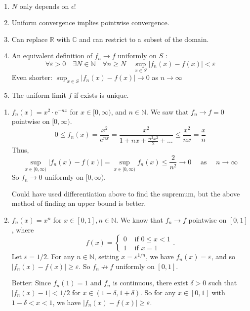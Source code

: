 \documentclass[a4paper]{article}
\begin{document}
\begin{remark}\
    \begin{enumerate}
        \item $ N $ only depends on $\epsilon$!
        \item Uniform convergence implies pointwise convergence.
        \item Can replace $\mathbb{R}$ with $\mathbb{C}$ and can restrict to a subset of the domain.
        \item An equivalent definition of $f_{n} \rightarrow f$ uniformly on $S$ :
        \[
        \forall \varepsilon>0 \quad \exists N \in \mathbb{N} \quad \forall n \geqslant N \quad \sup _{x \in S}\left|f_{n}(x)-f(x)\right|<\varepsilon
        \]
        Even shorter: $\sup _{x \in S}\left|f_{n}(x)-f(x)\right| \rightarrow 0$ as $n \rightarrow \infty$
        \item The uniform limit $f$ if exists is unique.
    \end{enumerate}
\end{remark}

\begin{example}
\begin{enumerate}
    \item $f_{n}(x)=x^{2} \cdot \mathrm{e}^{-n x}$ for $x \in[0, \infty)$, and $n \in \mathbb{N}$. We saw that $f_{n} \rightarrow f=0$ pointwise on $[0, \infty)$.
    \[
    0 \leqslant f_{n}(x)=\frac{x^{2}}{e^{n x}}=\frac{x^{2}}{1+n x+\frac{n^{2} x^{2}}{2}+\ldots} \leqslant \frac{x^{2}}{n x}=\frac{x}{n}
    \]
    Thus,
    \[
    \sup _{x \in[0, \infty)}\left|f_{n}(x)-f(x)\right|=\sup _{x \in[0, \infty)} f_{n}(x) \leqslant \frac{2}{n^{2}} \rightarrow 0 \quad \text { as } \quad n \rightarrow \infty
    \]
    So $f_{n} \rightarrow 0$ uniformly on $[0, \infty)$.

    Could have used differentiation above to find the supremum, but the above method of finding an upper bound is better.
    \item $f_{n}(x)=x^{n}$ for $x \in[0,1], n \in \mathbb{N}$.
    We know that $f_{n} \rightarrow f$ pointwise on $[0,1]$, where
    \[
        f(x)= \begin{cases}0 & \text { if } 0 \leqslant x<1 \\ 1 & \text { if } x=1\end{cases}.
    \]
    Let $\varepsilon=1 / 2$. For any $n \in \mathbb{N}$, setting $x=\varepsilon^{1 / n}$, we have $f_{n}(x)=\varepsilon$, and so $\left|f_{n}(x)-f(x)\right| \geqslant \varepsilon$. So $f_{n} \not \rightarrow  f$ uniformly on $[0,1]$.

    Better: Since $f_{n}(1)=1$ and $f_{n}$ is continuous, there exist $\delta>0$ such that $\left|f_{n}(x)-1\right|<1 / 2$ for $x \in(1-\delta, 1+\delta)$. So for any $x \in[0,1]$ with $1-\delta<x<1$, we have $\left|f_{n}(x)-f(x)\right| \geqslant \varepsilon$.
\end{enumerate}
\end{example}
\end{document}

